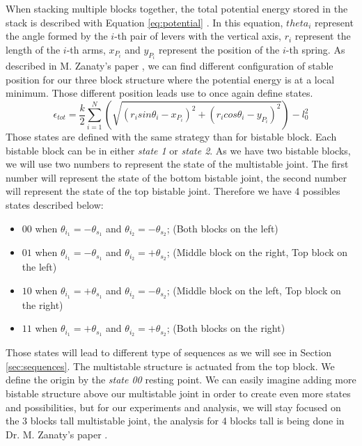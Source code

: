         When stacking multiple blocks together, the total potential energy stored in the stack is described with Equation \ref{eq:potential}  \cite{mo_main_paper}. In this equation, $theta_i$ represent the angle formed by the $i$-th pair of levers with the vertical axis, $r_i$ represent the length of the $i$-th arms, $x_{P_i}$ and $y_{P_i}$ represent the position of the $i$-th spring. As described in M. Zanaty's paper \cite{mo_main_paper}, we can find different configuration of stable position for our three block structure where the potential energy is at a local minimum. Those different position leads use to once again define states. 
        \begin{equation}
            \epsilon_{tot} = \frac{k}{2} \sum_{i=1}^{N}\left(\sqrt{(r_i sin \theta_i - x_{P_i})^2 + (r_i cos \theta_i - y_{P_i})^2} \right) - l_0^2
            \label{eq:potential}
        \end{equation}
        Those states are defined with the same strategy than for bistable block. Each bistable block can be in either \textit{state 1} or \textit{state 2}. As we have two bistable blocks, we will use two numbers to represent the state of the multistable joint. The first number will represent the state of the bottom bistable joint, the second number will represent the state of the top bistable joint. Therefore we have 4 possibles states described below: \\
        \begin{itemize}
            \item $00$ when $\theta_{i_1} = -\theta_{s_1}$ and $\theta_{i_2} = -\theta_{s_2}$; (Both blocks on the left)
            \item $01$ when $\theta_{i_1} = -\theta_{s_1}$ and $\theta_{i_2} = +\theta_{s_2}$; (Middle block on the right, Top block on the left)
            \item $10$ when $\theta_{i_1} = +\theta_{s_1}$ and $\theta_{i_2} = -\theta_{s_2}$; (Middle block on the left, Top block on the right)
            \item $11$ when $\theta_{i_1} = +\theta_{s_1}$ and $\theta_{i_2} = +\theta_{s_2}$; (Both blocks on the right)
        \end{itemize}
        
        Those states will lead to different type of sequences as we will see in Section \ref{sec:sequences}. The multistable structure is actuated from the top block. We define the origin by the \textit{state 00} resting point. We can easily imagine adding more bistable structure above our multistable joint in order to create even more states and possibilities, but for our experiments and analysis, we will stay focused on the 3 blocks tall multistable joint, the analysis for 4 blocks tall is being done in Dr. M. Zanaty's paper \cite{mo_main_paper}.
        
